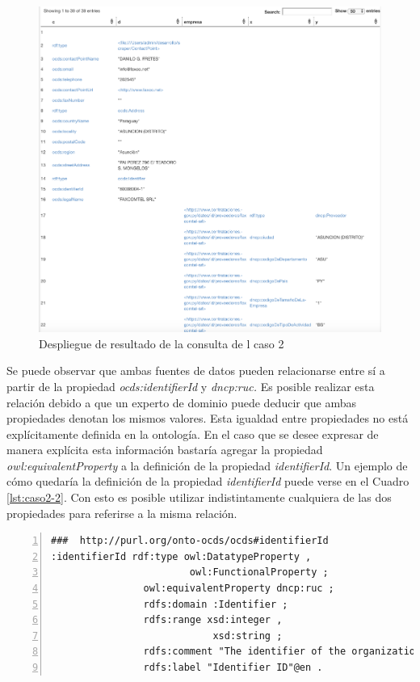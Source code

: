  \begin{figure}[ht!]
    \centering
    \includegraphics[width=150mm]{figuras/caso2Resultado.png}
    \caption{Despliegue de resultado de la consulta de l caso 2}
    \label{img:caso2Resultado}
 \end{figure}


 Se puede observar que ambas fuentes de datos pueden relacionarse entre sí a partir de la propiedad \textit{ocds:identifierId} y \textit{dncp:ruc.} Es posible realizar esta relación debido a que un experto de dominio puede deducir que ambas propiedades denotan los mismos valores. Esta igualdad entre propiedades no está explícitamente definida en la ontología. En el caso que se desee expresar de manera explícita esta información bastaría agregar la propiedad \textit{owl:equivalentProperty} a la definición de la propiedad \textit{identifierId}. Un ejemplo de cómo quedaría la definición de la propiedad \textit{identifierId} puede verse en el Cuadro \ref{lst:caso2-2}. Con esto es posible utilizar indistintamente cualquiera de las dos propiedades para referirse a la misma relación.\hfill \break

\noindent\begin{minipage}{\textwidth}
 \begin{lstlisting}[captionpos=b, caption={Declaración de equivalencia semántica entre dncp:ruc y ocds:identifierID}, label=lst:caso2-2,  numbers=left,  numberstyle=\tiny\color{mygray},
    basicstyle=\footnotesize\ttfamily,frame=single]
###  http://purl.org/onto-ocds/ocds#identifierId
:identifierId rdf:type owl:DatatypeProperty ,
                        owl:FunctionalProperty ;
                owl:equivalentProperty dncp:ruc ;
                rdfs:domain :Identifier ;
                rdfs:range xsd:integer ,
                            xsd:string ;
                rdfs:comment "The identifier of the organization in the selected scheme."@en ;
                rdfs:label "Identifier ID"@en .
 \end{lstlisting}
\end{minipage}

